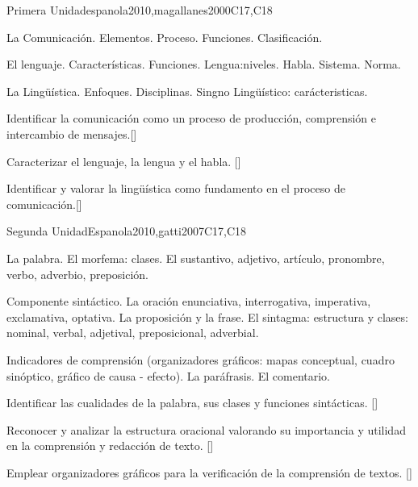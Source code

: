\begin{syllabus}
\begin{unit}{}{Primera Unidad}{espanola2010,magallanes2000}{}{C17,C18}
\begin{topics}
    \item La Comunicación.
		\subitem Elementos.
		\subitem Proceso.
		\subitem Funciones.
		\subitem Clasificación.
	\item El lenguaje.
		\subitem Características.
		\subitem Funciones.
		\subitem Lengua:niveles.
		\subitem Habla.
		\subitem Sistema.
		\subitem Norma.
    \item La Lingüística.
		\subitem Enfoques.
		\subitem Disciplinas.
		\subitem Singno Lingüístico: carácteristicas.
    \end{topics}
	
\begin{learningoutcomes}
   \item Identificar la comunicación como un proceso de producción, comprensión e intercambio de mensajes.[\Familiarity]
   \item Caracterizar el lenguaje, la lengua y el habla. [\Familiarity]
   \item Identificar y valorar la lingüística como fundamento en el proceso de comunicación.[\Familiarity]
\end{learningoutcomes}

\end{unit}

\begin{unit}{}{Segunda Unidad}{Espanola2010,gatti2007}{}{C17,C18}
\begin{topics}
	\item La palabra.
		\subitem El morfema: clases.
		\subitem El sustantivo, adjetivo, artículo, pronombre, verbo, adverbio, preposición.
	\item Componente sintáctico.
		\subitem La oración enunciativa, interrogativa, imperativa, exclamativa, optativa.
		\subitem La proposición y la frase. 
		\subitem El sintagma: estructura y clases: nominal, verbal, adjetival, preposicional, adverbial.
	\item Indicadores de comprensión (organizadores gráficos: mapas conceptual, cuadro sinóptico, gráfico de causa - efecto).
		\subitem La paráfrasis.
		\subitem El comentario.
\end{topics}
\begin{learningoutcomes}
   \item Identificar las cualidades de la palabra,  sus clases y funciones sintácticas. [\Familiarity]
   \item Reconocer y analizar  la estructura oracional valorando su importancia y utilidad en la comprensión y redacción de texto. [\Familiarity]
   \item Emplear organizadores gráficos para la verificación de la comprensión de textos. [\Usage]
\end{learningoutcomes}
\end{unit}


\end{syllabus}
